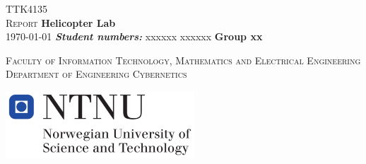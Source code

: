 \documentclass[pdftex,12pt,a4paper]{report}
\begin{document}
\begin{titlepage}
\begin{center}

\textsc{\LARGE TTK4135}\\[1.5cm]
\textsc{\LARGE Report} \linebreak
{ \huge \bfseries \textcolor[rgb]{0,0,1}{Helicopter Lab}\\[0.5cm] }
\today \vspace{1cm} \linebreak 
\emph{\textbf{Student numbers:}} \linebreak 
xxxxxx \linebreak
xxxxxx \linebreak\linebreak \textbf{Group xx}  \vspace{3cm}\linebreak \linebreak

\textsc{Faculty of Information Technology, Mathematics and Electrical Engineering}\linebreak
\textsc{Department of Engineering Cybernetics} 
\vfill


\includegraphics[width=200pt, keepaspectratio=true]{logo}

\end{center}
\end{titlepage}
\end{document}
